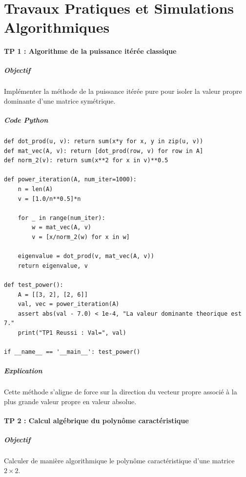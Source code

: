 \documentclass[11pt,a4paper]{article}
\begin{document}
\newpage
\part{Travaux Pratiques et Simulations Algorithmiques}
\subsection*{TP 1 : Algorithme de la puissance itérée classique}

\subsubsection*{Objectif}
Implémenter la méthode de la puissance itérée pure pour isoler la valeur propre dominante d'une matrice symétrique.

\subsubsection*{Code Python}
\begin{lstlisting}
def dot_prod(u, v): return sum(x*y for x, y in zip(u, v))
def mat_vec(A, v): return [dot_prod(row, v) for row in A]
def norm_2(v): return sum(x**2 for x in v)**0.5

def power_iteration(A, num_iter=1000):
    n = len(A)
    v = [1.0/n**0.5]*n

    for _ in range(num_iter):
        w = mat_vec(A, v)
        v = [x/norm_2(w) for x in w]

    eigenvalue = dot_prod(v, mat_vec(A, v))
    return eigenvalue, v

def test_power():
    A = [[3, 2], [2, 6]]
    val, vec = power_iteration(A)
    assert abs(val - 7.0) < 1e-4, "La valeur dominante theorique est 7."
    print("TP1 Reussi : Val=", val)

if __name__ == '__main__': test_power()
\end{lstlisting}
\subsubsection*{Explication}
Cette méthode s'aligne de force sur la direction du vecteur propre associé à la plus grande valeur propre en valeur absolue.


\subsection*{TP 2 : Calcul algébrique du polynôme caractéristique}

\subsubsection*{Objectif}
Calculer de manière algorithmique le polynôme caractéristique d'une matrice $2 \times 2$.
\end{document}
